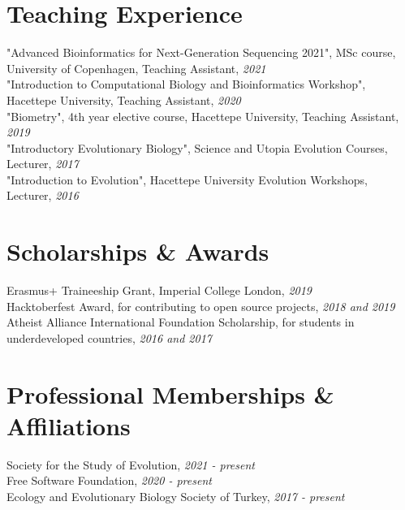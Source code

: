 \documentclass[letterpaper,10.5pt]{article}
\begin{document}

\section{Teaching Experience}
"Advanced Bioinformatics for Next-Generation Sequencing 2021", MSc course, University of Copenhagen, Teaching Assistant, \textit{2021} \\
"Introduction to Computational Biology and Bioinformatics Workshop", Hacettepe University, Teaching Assistant, \textit{2020} \\
"Biometry", 4th year elective course, Hacettepe University, Teaching Assistant, \textit{2019} \\
"Introductory Evolutionary Biology", Science and Utopia Evolution Courses, Lecturer,  \textit{2017} \\
"Introduction to Evolution", Hacettepe University Evolution Workshops, Lecturer, \textit{2016} \\


\section{Scholarships \& Awards}
Erasmus+ Traineeship Grant, Imperial College London, \textit{2019} \\
Hacktoberfest Award, for contributing to open source projects, \textit{2018 and 2019} \\
Atheist Alliance International Foundation Scholarship, for students in underdeveloped countries, \textit{2016 and 2017} \\

\section{Professional Memberships \& Affiliations}	
Society for the Study of Evolution, \textit{2021 - present} \\
Free Software Foundation, \textit{2020 - present} \\
Ecology and Evolutionary Biology Society of Turkey, \textit{2017 - present} \\
\end{document}
